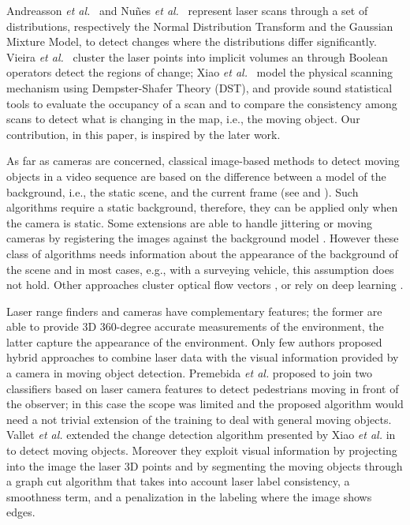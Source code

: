 Andreasson \emph{et al.}~\cite{andreasson2007has} and Nu{\~n}es \emph{et al.}~\cite{nunez2010change} represent laser scans through a set of distributions, respectively the Normal Distribution Transform and the Gaussian Mixture Model, to detect changes where the distributions differ significantly. 
Vieira \emph{et al.}~\cite{vieira2014spatial} cluster the laser points into implicit volumes an through Boolean operators detect the regions of change;
Xiao \emph{et al.}~\cite{xiao2013change} model the physical scanning mechanism using Dempster-Shafer Theory (DST), and provide sound statistical tools to evaluate the occupancy of a scan and to compare the consistency among scans to detect what is changing in the map, i.e., the moving object. %
Our contribution, in this paper, is inspired by the later work.

As far as cameras are concerned, classical image-based methods to detect moving objects in a video sequence are based on the difference between a model of the background, i.e., the static scene, and the current frame (see \cite{Piccardi2004background} and \cite{Sobral2014}). 
Such algorithms require a static background, therefore, they can be applied only when the camera is static. 
Some extensions are able to handle jittering or moving cameras by registering the images against the background model \cite{azzari2005effective,Andrea,kim2013detection,shakeri2014detection}.
However these class of algorithms needs information about the appearance of the background of the scene and in most cases, e.g., with a surveying vehicle, this assumption does not hold. 
Other approaches cluster optical flow vectors \cite{markovic2014moving}, or rely on deep learning \cite{lin2014deep}.

Laser range finders and cameras have complementary features; the former are able to provide 3D 360-degree accurate measurements of the environment, the latter capture the appearance of the environment. Only few authors proposed hybrid approaches to combine laser data with the visual information provided by a camera in moving object detection.
Premebida \emph{et al.} \cite{premebida2009lidar} proposed to join two classifiers based on laser camera features to detect pedestrians moving in front of the observer; in this case the scope was limited and the proposed algorithm would need a not trivial extension of the training to deal with general moving objects.
Vallet \emph{et al.} \cite{vallet2015extracting} extended the change detection algorithm presented by Xiao \emph{et al.} in \cite{xiao2013change} to detect moving objects. Moreover they exploit visual information by projecting into the image the laser 3D points and by segmenting the moving objects through a graph cut algorithm that takes into account laser label consistency, a smoothness term, and a penalization in the labeling where the image shows edges. 

